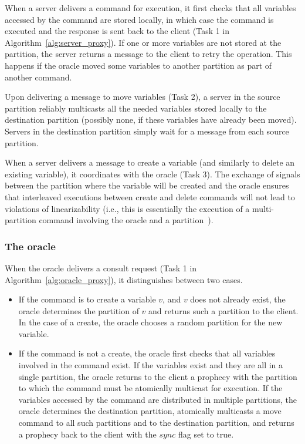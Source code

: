 When a server delivers a command for execution, it first checks that all variables accessed by the command are stored locally, in which case the command is executed and the response is sent back to the client (Task 1 in Algorithm~\ref{alg:server_proxy}).
If one or more variables are not stored at the partition, the server returns a message to the client to retry the operation.
This happens if the oracle moved some variables to another partition as part of another command. 

Upon delivering a message to move variables (Task 2), a server in the source partition reliably multicasts all the needed variables stored locally to the destination partition (possibly none, if these variables have already been moved).
Servers in the destination partition simply wait for a message from each source partition.

When a server delivers a message to create a variable (and similarly to delete an existing variable), it coordinates with the oracle (Task 3).
The exchange of signals between the partition where the variable will be created and the oracle ensures that interleaved executions between create and delete commands will not lead to violations of linearizability (i.e., this is essentially the execution of a multi-partition command involving the oracle and a partition~\cite{bezerra2014ssmr}).

\subsubsection{The oracle} 

When the oracle delivers a consult request (Task 1 in Algorithm~\ref{alg:oracle_proxy}), it distinguishes between two cases.
\begin{itemize}
\item If the command is to create a variable $v$, and $v$ does not already exist, the oracle determines the partition of $v$ and returns such a partition to the client.
In the case of a create, the oracle chooses a random partition for the new variable.
\item If the command is not a create, the oracle first checks that all variables involved in the command exist.
If the variables exist and they are all in a single partition, the oracle returns to the client a prophecy with the partition to which the command must be atomically multicast for execution.
If the variables accessed by the command are distributed in multiple partitions, the oracle determines the destination partition, atomically multicasts a move command to all such partitions and to the destination partition, and returns a prophecy back to the client with the $sync$ flag set to true.
\end{itemize}


